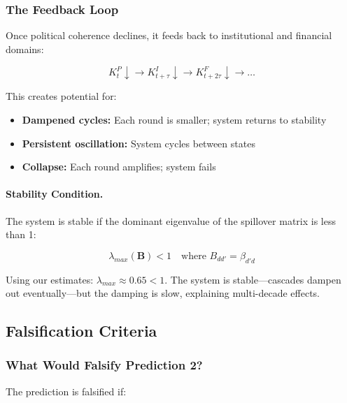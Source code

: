 \subsubsection{The Feedback Loop}

Once political coherence declines, it feeds back to institutional and financial domains:

\begin{equation}
K^P_t \downarrow \to K^I_{t+\tau} \downarrow \to K^F_{t+2\tau} \downarrow \to \ldots
\end{equation}

This creates potential for:
\begin{itemize}
    \item \textbf{Dampened cycles:} Each round is smaller; system returns to stability
    \item \textbf{Persistent oscillation:} System cycles between states
    \item \textbf{Collapse:} Each round amplifies; system fails
\end{itemize}

\paragraph{Stability Condition.}
The system is stable if the dominant eigenvalue of the spillover matrix is less than 1:

\begin{equation}
\lambda_{max}(\mathbf{B}) < 1 \quad \text{where } B_{dd'} = \beta_{d'd}
\end{equation}

Using our estimates: $\lambda_{max} \approx 0.65 < 1$. The system is stable---cascades 
dampen out eventually---but the damping is slow, explaining multi-decade effects.

\subsection{Falsification Criteria}

\subsubsection{What Would Falsify Prediction 2?}

The prediction is falsified if:

